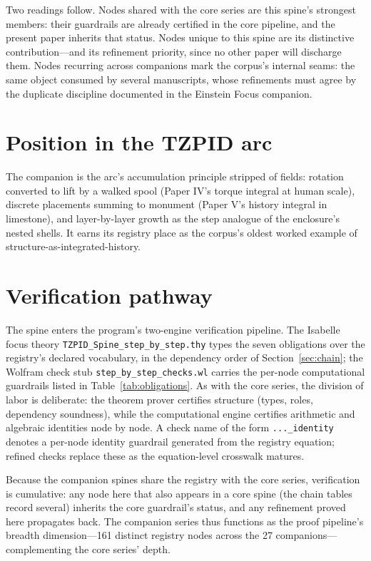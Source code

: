 \documentclass[11pt]{article}
\theoremstyle{remark}
\begin{document}
Two readings follow. Nodes shared with the core series are this spine's strongest members: their guardrails are already certified in the core pipeline, and the present paper inherits that status. Nodes unique to this spine are its distinctive contribution---and its refinement priority, since no other paper will discharge them. Nodes recurring across companions mark the corpus's internal seams: the same object consumed by several manuscripts, whose refinements must agree by the duplicate discipline documented in the Einstein Focus companion.

\section{Position in the TZPID arc}
\label{sec:arc}

The companion is the arc's accumulation principle stripped of fields: rotation converted to lift by a walked spool (Paper IV's torque integral at human scale), discrete placements summing to monument (Paper V's history integral in limestone), and layer-by-layer growth as the step analogue of the enclosure's nested shells. It earns its registry place as the corpus's oldest worked example of structure-as-integrated-history.

\section{Verification pathway}
\label{sec:verify}

The spine enters the program's two-engine verification pipeline. The Isabelle focus theory \texttt{TZPID\_Spine\_step\_by\_step.thy} types the seven obligations over the registry's declared vocabulary, in the dependency order of Section~\ref{sec:chain}; the Wolfram check stub \texttt{step\_by\_step\_checks.wl} carries the per-node computational guardrails listed in Table~\ref{tab:obligations}. As with the core series, the division of labor is deliberate: the theorem prover certifies structure (types, roles, dependency soundness), while the computational engine certifies arithmetic and algebraic identities node by node. A check name of the form \texttt{...\_identity} denotes a per-node identity guardrail generated from the registry equation; refined checks replace these as the equation-level crosswalk matures.

Because the companion spines share the registry with the core series, verification is cumulative: any node here that also appears in a core spine (the chain tables record several) inherits the core guardrail's status, and any refinement proved here propagates back. The companion series thus functions as the proof pipeline's breadth dimension---161 distinct registry nodes across the 27 companions---complementing the core series' depth.
\end{document}
